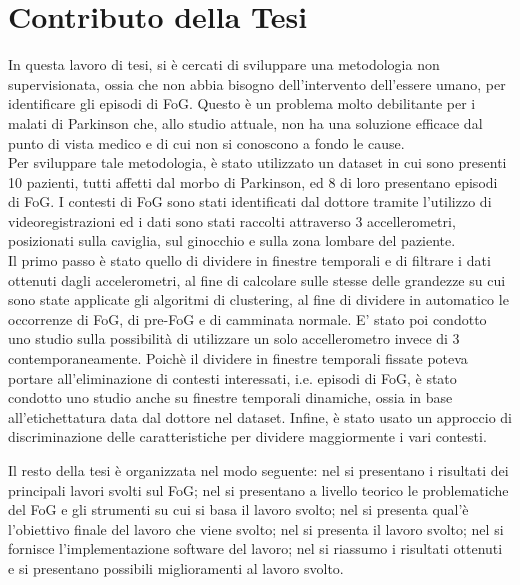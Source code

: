 \section{Contributo della Tesi}\label{cap1:Contributo della Tesi}
In questa lavoro di tesi, si è cercati di sviluppare una metodologia non supervisionata, ossia che non abbia bisogno dell'intervento dell'essere umano, per identificare gli episodi di FoG. Questo è un problema molto debilitante per i malati di Parkinson che, allo studio attuale, non ha una soluzione efficace dal punto di vista medico e di cui non si conoscono a fondo le cause.\\
Per sviluppare tale metodologia, è stato utilizzato un dataset in cui sono presenti 10 pazienti, tutti affetti dal morbo di Parkinson, ed 8 di loro presentano episodi di FoG. I contesti di FoG sono stati identificati dal dottore tramite l'utilizzo di videoregistrazioni ed i dati sono stati raccolti attraverso 3 accellerometri, posizionati sulla caviglia, sul ginocchio e sulla zona lombare del paziente.\\
Il primo passo è stato quello di dividere in finestre temporali e di filtrare i dati ottenuti dagli accelerometri, al fine di calcolare sulle stesse delle grandezze su cui sono state applicate gli algoritmi di clustering, al fine di dividere in automatico le occorrenze di FoG, di pre-FoG e di camminata normale. E' stato poi condotto uno studio sulla possibilità di utilizzare un solo accellerometro invece di 3 contemporaneamente. Poichè il dividere in finestre temporali fissate poteva portare all'eliminazione di contesti interessati, i.e. episodi di FoG, è stato condotto uno studio anche su finestre temporali dinamiche, ossia in base all'etichettatura data dal dottore nel dataset. Infine, è stato usato un approccio di discriminazione delle caratteristiche per dividere maggiormente i vari contesti.


Il resto della tesi è organizzata nel modo seguente: nel \textbf{} si presentano i risultati dei principali lavori svolti sul FoG; nel \textbf{} si presentano a livello teorico le problematiche del FoG e gli strumenti su cui si basa il lavoro svolto; nel \textbf{} si presenta qual'è l'obiettivo finale del lavoro che viene svolto; nel \textbf{} si presenta il lavoro svolto; nel \textbf{} si fornisce l'implementazione software del lavoro; nel \textbf{} si riassumo i risultati ottenuti e si presentano possibili miglioramenti al lavoro svolto.
 